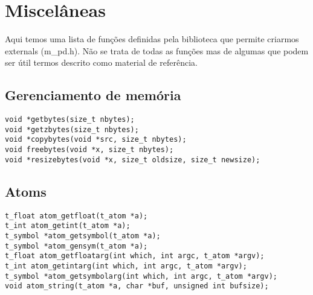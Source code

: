 
\chapter{Miscelâneas}

Aqui temos uma lista de funções definidas pela biblioteca que permite criarmos externals 
(m\_pd.h). Não se trata de todas as funções mas de algumas que podem ser útil termos descrito
como material de referência.

\section{Gerenciamento de memória}
\begin{lstlisting}
void *getbytes(size_t nbytes);
void *getzbytes(size_t nbytes);
void *copybytes(void *src, size_t nbytes);
void freebytes(void *x, size_t nbytes);
void *resizebytes(void *x, size_t oldsize, size_t newsize);
\end{lstlisting}

\section{Atoms}
\begin{lstlisting}
t_float atom_getfloat(t_atom *a);
t_int atom_getint(t_atom *a);
t_symbol *atom_getsymbol(t_atom *a);
t_symbol *atom_gensym(t_atom *a);
t_float atom_getfloatarg(int which, int argc, t_atom *argv);
t_int atom_getintarg(int which, int argc, t_atom *argv);
t_symbol *atom_getsymbolarg(int which, int argc, t_atom *argv);
void atom_string(t_atom *a, char *buf, unsigned int bufsize);
\end{lstlisting}

